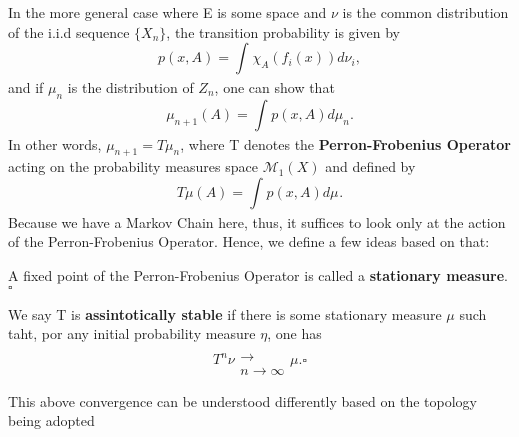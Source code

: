 \documentclass[../stationary_ifs.tex]{subfiles}
\begin{document}
In the more general case where E is some space and \(\nu \) is the common distribution of the i.i.d sequence \(\{X_{n}\}\), the transition probability is given by
\[
	p(x, A) = \int_{}\chi_{A}(f_{i}(x)) d\nu_{i},
\]
and if \(\mu_{n}\) is the distribution of \(Z_{n}\), one can show that
\[
	\mu_{n+1}(A) = \int_{}p(x, A) d\mu_{n}.
\]
In other words, \(\mu_{n+1} = T \mu_{n}\), where T denotes the \textbf{Perron-Frobenius Operator} acting on the probability measures space \(\mathcal{M}_1(X)\) and defined by
\[
	T\mu (A) = \int_{}p(x, A) d\mu_{}.
\]
Because we have a Markov Chain here, thus, it suffices to look only at the action of the Perron-Frobenius Operator. Hence, we define a few ideas based on that:
\begin{def*}
	A fixed point of the Perron-Frobenius Operator is called a \textbf{stationary measure}. \(\square\)
\end{def*}
\begin{def*}
	We say T is \textbf{assintotically stable} if there is some stationary measure \(\mu \) such taht, por any initial probability measure \(\eta \), one has
	\[
		T^{n}\nu \substack{ \\ \longrightarrow \\ n\to \infty} \mu . \square
	\]
\end{def*}
This above convergence can be understood differently based on the topology being adopted
\end{document}

